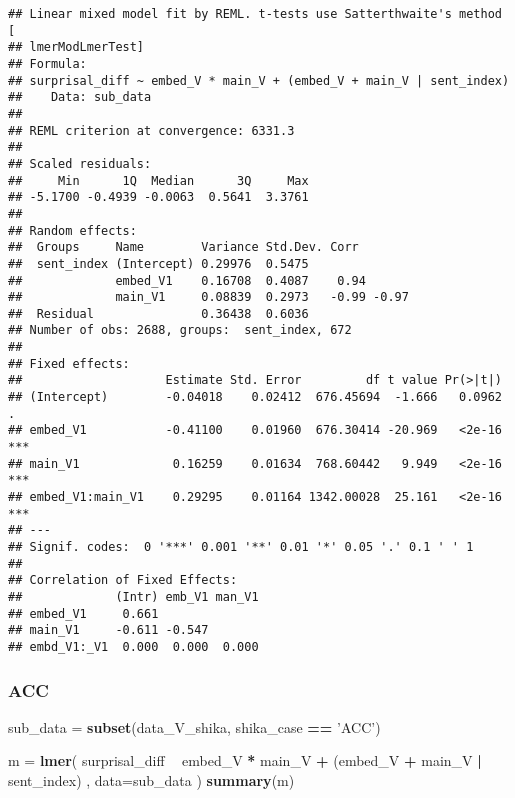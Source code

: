 \documentclass[]{ltjsarticle}
\newenvironment{Shaded}{\begin{snugshade}}{\end{snugshade}}
\newcommand{\KeywordTok}[1]{\textcolor[rgb]{0.13,0.29,0.53}{\textbf{#1}}}
\newcommand{\DataTypeTok}[1]{\textcolor[rgb]{0.13,0.29,0.53}{#1}}
\newcommand{\StringTok}[1]{\textcolor[rgb]{0.31,0.60,0.02}{#1}}
\newcommand{\OperatorTok}[1]{\textcolor[rgb]{0.81,0.36,0.00}{\textbf{#1}}}
\newcommand{\NormalTok}[1]{#1}
\begin{document}
\begin{verbatim}
## Linear mixed model fit by REML. t-tests use Satterthwaite's method [
## lmerModLmerTest]
## Formula: 
## surprisal_diff ~ embed_V * main_V + (embed_V + main_V | sent_index)
##    Data: sub_data
## 
## REML criterion at convergence: 6331.3
## 
## Scaled residuals: 
##     Min      1Q  Median      3Q     Max 
## -5.1700 -0.4939 -0.0063  0.5641  3.3761 
## 
## Random effects:
##  Groups     Name        Variance Std.Dev. Corr       
##  sent_index (Intercept) 0.29976  0.5475              
##             embed_V1    0.16708  0.4087    0.94      
##             main_V1     0.08839  0.2973   -0.99 -0.97
##  Residual               0.36438  0.6036              
## Number of obs: 2688, groups:  sent_index, 672
## 
## Fixed effects:
##                    Estimate Std. Error         df t value Pr(>|t|)    
## (Intercept)        -0.04018    0.02412  676.45694  -1.666   0.0962 .  
## embed_V1           -0.41100    0.01960  676.30414 -20.969   <2e-16 ***
## main_V1             0.16259    0.01634  768.60442   9.949   <2e-16 ***
## embed_V1:main_V1    0.29295    0.01164 1342.00028  25.161   <2e-16 ***
## ---
## Signif. codes:  0 '***' 0.001 '**' 0.01 '*' 0.05 '.' 0.1 ' ' 1
## 
## Correlation of Fixed Effects:
##             (Intr) emb_V1 man_V1
## embed_V1     0.661              
## main_V1     -0.611 -0.547       
## embd_V1:_V1  0.000  0.000  0.000
\end{verbatim}

\subsubsection{ACC}\label{acc-1}

\begin{Shaded}
\begin{Highlighting}[]
\NormalTok{sub_data =}\StringTok{ }\KeywordTok{subset}\NormalTok{(data_V_shika, shika_case }\OperatorTok{==}\StringTok{ 'ACC'}\NormalTok{)}

\NormalTok{m =}\StringTok{ }\KeywordTok{lmer}\NormalTok{(}
\NormalTok{        surprisal_diff}
            \OperatorTok{~}\StringTok{ }\NormalTok{embed_V }\OperatorTok{*}\StringTok{ }\NormalTok{main_V}
                \OperatorTok{+}\StringTok{ }\NormalTok{(embed_V }\OperatorTok{+}\StringTok{ }\NormalTok{main_V }\OperatorTok{|}\StringTok{ }\NormalTok{sent_index)}
\NormalTok{        ,}
        \DataTypeTok{data=}\NormalTok{sub_data}
\NormalTok{        )}
\KeywordTok{summary}\NormalTok{(m)}
\end{Highlighting}
\end{Shaded}
\end{document}
